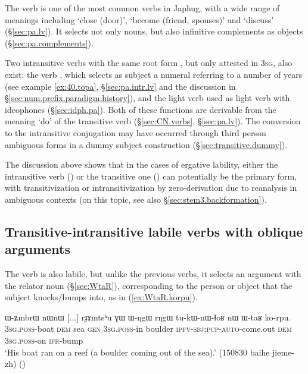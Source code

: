The verb  is one of the most common verbs in Japhug, with a wide range of meanings including `close (door)', `become (friend, spouses)' and `discuss' (§\ref{sec:pa.lv}). It selects not only nouns, but also infinitive complements as objects (§\ref{sec:pa.complements}).
 
Two intransitive verbs with the same root form , but only attested in \textsc{3sg}, also exist: the verb , which selects as subject a numeral referring to a number of years (see example \ref{ex:40.topa}, §\ref{sec:pa.intr.lv} and the discussion in §\ref{sec:num.prefix.paradigm.history}), and the light verb  used as light verb with ideophones (§\ref{sec:idph.pa}). Both of these functions are derivable from the meaning `do' of the transitive verb (§\ref{sec:CN.verbs}, §\ref{sec:pa.lv}). The conversion to the intransitive conjugation may have occurred through third person ambiguous forms in a dummy subject construction (§\ref{sec:transitive.dummy}).

The discussion above shows that in the cases of ergative lability, either the intransitive verb () or the transitive one () can potentially be the primary form, with transitivization or intransitivization by zero-derivation due to reanalysis in ambiguous contexts (on this topic, see also §\ref{sec:stem3.backformation}).

\subsection{Transitive-intransitive labile verbs with oblique arguments} \label{sec:goal.labile}
The verb  is also labile, but unlike the previous verbs, it selects an argument with the relator noun  (§\ref{sec:WtaR}), corresponding to the person or object that the subject knocks/bumps into, as in (\ref{ex:WtaR.korpu}).
 
 \begin{exe}
\ex \label{ex:WtaR.korpu}
\gll   ɯ-ʑmbrɯ nɯnɯ [...] rɟɤmtsʰu ɣɯ ɯ-ŋgɯ rŋgɯ tu-kɯ-nɯ-ɬoʁ nɯ ɯ-taʁ ko-rpu. \\ 
\textsc{3sg}.\textsc{poss}-boat \textsc{dem} { } sea \textsc{gen} \textsc{3sg}.\textsc{poss}-in boulder \textsc{ipfv}-\textsc{sbj}:\textsc{pcp}-\textsc{auto}-come.out \textsc{dem} \textsc{3sg}.\textsc{poss}-on \textsc{ifr}-bump \\
\glt  `His boat ran on a reef (a boulder coming out of the sea).' (150830 baihe jieme-zh)
()
\end{exe}

